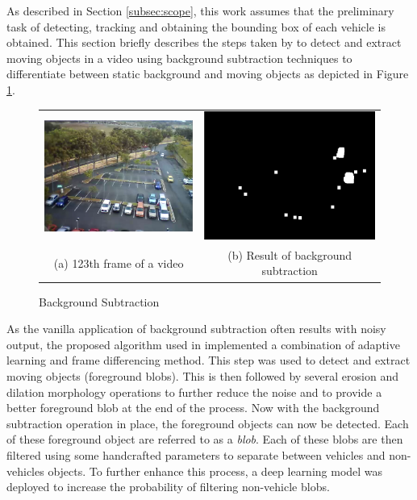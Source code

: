 As described in Section \ref{subsec:scope}, this work assumes that the preliminary task of detecting, tracking and obtaining the bounding box of each vehicle is obtained. This section briefly describes the steps taken by  to detect and extract moving objects in a video using background subtraction techniques to differentiate between static background and moving objects as depicted in Figure \ref{fig:bgs}. 

\begin{figure}[htb!]
  \centering
\begin{tabular}{cc}
 \includegraphics[width=0.4\linewidth]{image/general/bgs1.png} &  \includegraphics[width=0.4\linewidth]{image/general/bgs2.png}  \\ 
(a) 123th frame of a video & (b) Result of background subtraction \\
\end{tabular}
\caption{Background Subtraction} 
\label{fig:bgs}
\end{figure}

As the vanilla application of background subtraction often results with noisy output, the proposed algorithm used in \cite{lim2017} implemented a combination of adaptive learning and frame differencing method. This step was used to detect and extract moving objects (foreground blobs). This is then followed by several erosion and dilation morphology operations to further reduce the noise and to provide a better foreground blob at the end of the process. 
Now with the background subtraction operation in place, the foreground objects can now be detected. Each of these foreground object are referred to as a \textit{blob}. Each of these blobs are then filtered using some handcrafted parameters to separate between vehicles and non-vehicles objects. To further enhance this process, a deep learning model was deployed to increase the probability of filtering non-vehicle blobs. 


